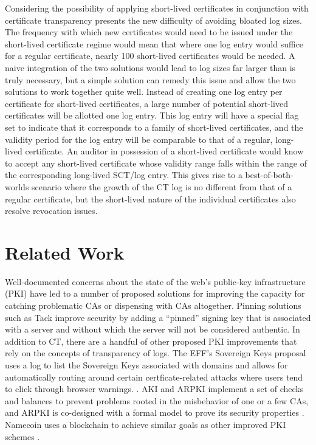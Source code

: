 \documentclass[letterpaper,twocolumn,10pt]{article}
\begin{document}
Considering the possibility of applying short-lived certificates in conjunction with certificate transparency presents the new difficulty of avoiding bloated log sizes. The frequency with which new certificates would need to be issued under the short-lived certificate regime would mean that where one log entry would suffice for a regular certificate, nearly 100 short-lived certificates would be needed. A naive integration of the two solutions would lead to log sizes far larger than is truly necessary, but a simple solution can remedy this issue and allow the two solutions to work together quite well. Instead of creating one log entry per certificate for short-lived certificates, a large number of potential short-lived certificates will be allotted one log entry. This log entry will have a special flag set to indicate that it corresponds to a family of short-lived certificates, and the validity period for the log entry will be comparable to that of a regular, long-lived certificate. An auditor in possession of a short-lived certificate would know to accept any short-lived certificate whose validity range falls within the range of the corresponding long-lived SCT/log entry. This gives rise to a best-of-both-worlds scenario where the growth of the CT log is no different from that of a regular certificate, but the short-lived nature of the individual certificates also resolve revocation issues.

\section{Related Work}

Well-documented concerns about the state of the web's public-key infrastructure (PKI) \cite{CO13} have led to a number of proposed solutions for improving the capacity for catching problematic CAs or dispensing with CAs altogether. Pinning solutions such as Tack \cite{Tack} improve security by adding a ``pinned'' signing key that is associated with a server and without which the server will not be considered authentic. In addition to CT, there are a handful of other proposed PKI improvements that rely on the concepts of transparency of logs. The EFF's Sovereign Keys proposal uses a log to list the Sovereign Keys associated with domains and allows for automatically routing around certain certficate-related attacks where users tend to click through browser warnings. \cite{SovKeys}. AKI and ARPKI implement a set of checks and balances to prevent problems rooted in the misbehavior of one or a few CAs, and ARPKI is co-designed with a formal model to prove its security properties \cite{KHP+13}\cite{BCK+14}. Namecoin uses a blockchain to achieve similar goals as other improved PKI schemes \cite{Namecoin}.
\end{document}
